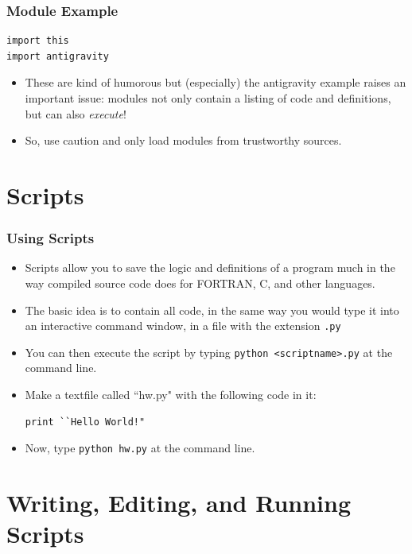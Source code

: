 \documentclass{beamer}
\begin{document}
\begin{frame}[fragile]
\frametitle{Module Example}

\begin{lstlisting}
import this
import antigravity
\end{lstlisting}
\pause
\begin{itemize}

\item These are kind of humorous but (especially) the antigravity example raises an important issue: \newline{}
modules not only contain a listing of code and definitions, but can also \emph{execute}!

\item So, use caution and only load modules from trustworthy sources.
\end{itemize}

\end{frame}

\section[]{Scripts}
\begin{frame}[fragile]
\frametitle{Using Scripts}
\begin{itemize}
\item Scripts allow you to save the logic and definitions of a program much in the
 way compiled source code does for FORTRAN, C, and other languages.
\item The basic idea is to contain all code, in the same way you would type it into an interactive 
command window, in a file with the extension \texttt{.py}
\item You can then execute the script by typing \newline{} \texttt{python <scriptname>.py} \newline{}at the command line.
\pause
\item Make a textfile called ``hw.py" with the following code in it:
\begin{lstlisting}
print ``Hello World!"
\end{lstlisting}
\item Now, type \texttt{python hw.py} at the command line.
\end{itemize}
\end{frame}

\section[]{Writing, Editing, and Running Scripts}
\end{document}
